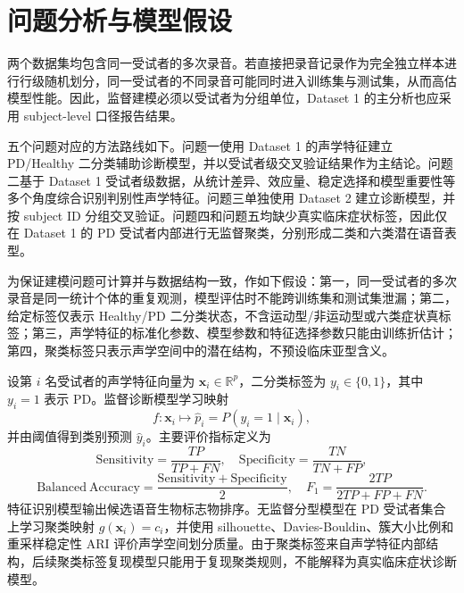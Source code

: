\section{问题分析与模型假设}

两个数据集均包含同一受试者的多次录音。若直接把录音记录作为完全独立样本进行行级随机划分，同一受试者的不同录音可能同时进入训练集与测试集，从而高估模型性能。因此，监督建模必须以受试者为分组单位，Dataset 1 的主分析也应采用 subject-level 口径报告结果。

五个问题对应的方法路线如下。问题一使用 Dataset 1 的声学特征建立 PD/Healthy 二分类辅助诊断模型，并以受试者级交叉验证结果作为主结论。问题二基于 Dataset 1 受试者级数据，从统计差异、效应量、稳定选择和模型重要性等多个角度综合识别判别性声学特征。问题三单独使用 Dataset 2 建立诊断模型，并按 subject ID 分组交叉验证。问题四和问题五均缺少真实临床症状标签，因此仅在 Dataset 1 的 PD 受试者内部进行无监督聚类，分别形成二类和六类潜在语音表型。

为保证建模问题可计算并与数据结构一致，作如下假设：第一，同一受试者的多次录音是同一统计个体的重复观测，模型评估时不能跨训练集和测试集泄漏；第二，给定标签仅表示 Healthy/PD 二分类状态，不含运动型/非运动型或六类症状真标签；第三，声学特征的标准化参数、模型参数和特征选择参数只能由训练折估计；第四，聚类标签只表示声学空间中的潜在结构，不预设临床亚型含义。

设第 \(i\) 名受试者的声学特征向量为 \(\mathbf{x}_i\in\mathbb{R}^p\)，二分类标签为 \(y_i\in\{0,1\}\)，其中 \(y_i=1\) 表示 PD。监督诊断模型学习映射
\begin{equation}
  f:\mathbf{x}_i\mapsto \hat{p}_i=P(y_i=1\mid \mathbf{x}_i),
\end{equation}
并由阈值得到类别预测 \(\hat{y}_i\)。主要评价指标定义为
\begin{equation}
  \mathrm{Sensitivity}=\frac{TP}{TP+FN},\quad
  \mathrm{Specificity}=\frac{TN}{TN+FP},
\end{equation}
\begin{equation}
  \mathrm{Balanced\ Accuracy}=\frac{\mathrm{Sensitivity}+\mathrm{Specificity}}{2},\quad
  F_1=\frac{2TP}{2TP+FP+FN}.
\end{equation}
特征识别模型输出候选语音生物标志物排序。无监督分型模型在 PD 受试者集合上学习聚类映射 \(g(\mathbf{x}_i)=c_i\)，并使用 silhouette、Davies-Bouldin、簇大小比例和重采样稳定性 ARI 评价声学空间划分质量。由于聚类标签来自声学特征内部结构，后续聚类标签复现模型只能用于复现聚类规则，不能解释为真实临床症状诊断模型。
